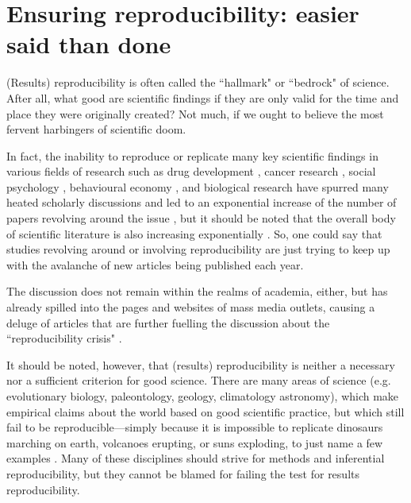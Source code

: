 \documentclass[11pt, a4paper,twoside]{report}\usepackage[]{graphicx}\usepackage[]{color}
\begin{document}
\section{Ensuring reproducibility: easier said than done}
(Results) reproducibility is often called the ``hallmark" \citep{aarts2015estimating,munafo_manifesto_2017} or ``bedrock" \citep{casadevall_reproducible_2010} of science. After all, what good are scientific findings if they are only valid for the time and place they were originally created? Not much, if we ought to believe the most fervent harbingers of scientific doom.

In fact, the inability to reproduce or replicate many key scientific findings in various fields of research such as drug development \citep{prinz_believe_2011,begley2012drug}, cancer research \citep{nosek_reproducibility_2017}, social psychology \citep{aarts2015estimating}, behavioural economy \citep{camerer_evaluating_2016}, and biological research \citep{freedman_economics_2015,vogt_authorization_2016} have spurred many heated scholarly discussions and led to an exponential increase of the number of papers revolving around the issue \citep{goodman_what_2016}, but it should be noted that the overall body of scientific literature is also increasing exponentially \citep{bornmann2015growth}. So, one could say that studies revolving around or involving reproducibility are just trying to keep up with the avalanche of new articles being published each year.

The discussion does not remain within the realms of academia, either, but has already spilled into the pages and websites of mass media outlets, causing a deluge of articles that are further fuelling the discussion about the ``reproducibility crisis" \citep{lehrer_truth_2010,carey_psychology_2015,carey_scrutiny_2015,achenbach_many_2015,achenbach_reproducibility_2015,yong_psychology_2016,engber_broken_2016,baker_crisis_2016,econ_try_2016,feilden_most_2017,belluz_cancer_2017,meyer_fix_2017}.

It should be noted, however, that (results) reproducibility is neither a necessary nor a sufficient criterion for good science. There are many areas of science (e.g. evolutionary biology, paleontology, geology, climatology astronomy), which make empirical claims about the world based on good scientific practice, but which still fail to be reproducible---simply because it is impossible to replicate dinosaurs marching on earth, volcanoes erupting, or suns exploding, to just name a few examples \citep{dfg_reproduzierbarkeit_2017}. Many of these disciplines should strive for methods and inferential reproducibility, but they cannot be blamed for failing the test for results reproducibility. 
\end{document}
